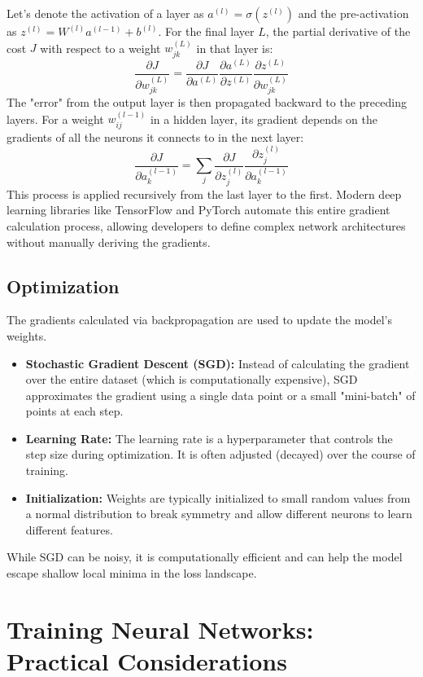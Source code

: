 \documentclass{article}
\begin{document}
\begin{multicols}{2}
Let's denote the activation of a layer as $a^{(l)} = \sigma(z^{(l)})$ and the pre-activation as $z^{(l)} = W^{(l)} a^{(l-1)} + b^{(l)}$. For the final layer $L$, the partial derivative of the cost $J$ with respect to a weight $w_{jk}^{(L)}$ in that layer is:
$$ \frac{\partial J}{\partial w_{jk}^{(L)}} = \frac{\partial J}{\partial a^{(L)}} \frac{\partial a^{(L)}}{\partial z^{(L)}} \frac{\partial z^{(L)}}{\partial w_{jk}^{(L)}} $$
The "error" from the output layer is then propagated backward to the preceding layers. For a weight $w_{ij}^{(l-1)}$ in a hidden layer, its gradient depends on the gradients of all the neurons it connects to in the next layer:
$$ \frac{\partial J}{\partial a_k^{(l-1)}} = \sum_j \frac{\partial J}{\partial z_j^{(l)}} \frac{\partial z_j^{(l)}}{\partial a_k^{(l-1)}} $$
This process is applied recursively from the last layer to the first. Modern deep learning libraries like TensorFlow and PyTorch automate this entire gradient calculation process, allowing developers to define complex network architectures without manually deriving the gradients.

\subsection{Optimization}
The gradients calculated via backpropagation are used to update the model's weights.
\begin{itemize}
    \item \textbf{Stochastic Gradient Descent (SGD):} Instead of calculating the gradient over the entire dataset (which is computationally expensive), SGD approximates the gradient using a single data point or a small "mini-batch" of points at each step.
    \item \textbf{Learning Rate:} The learning rate is a hyperparameter that controls the step size during optimization. It is often adjusted (decayed) over the course of training.
    \item \textbf{Initialization:} Weights are typically initialized to small random values from a normal distribution to break symmetry and allow different neurons to learn different features.
\end{itemize}
While SGD can be noisy, it is computationally efficient and can help the model escape shallow local minima in the loss landscape.


\section{Training Neural Networks: Practical Considerations}


\end{multicols}
\end{document}
